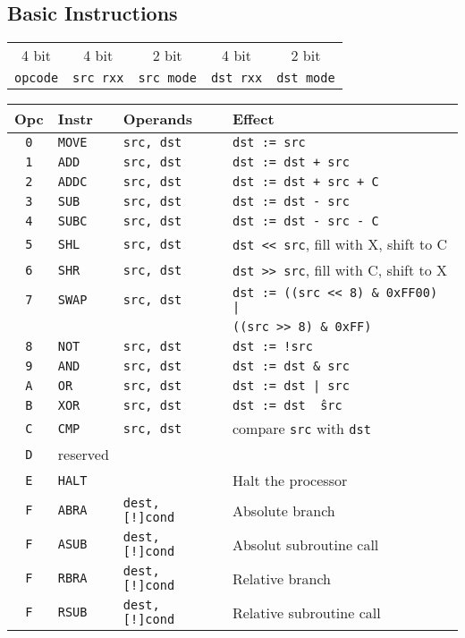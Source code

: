 \documentclass{leaflet}
\begin{document}
  \subsection{Basic Instructions}
   \begin{center}
    \begin{longtable}{|c||c|c||c|c|}
     \hline
     4 bit&4 bit&2 bit&4 bit&2 bit\\
     {\tt opcode}&{\tt src rxx}&{\tt src mode}&
     {\tt dst rxx}&{\tt dst mode}\\
     \hline
    \end{longtable}
   \end{center}
   \vspace*{-17mm}
   {\scriptsize
    \begin{center}
     \begin{longtable}{|c|ll|l|}
      \hline
       Opc&Instr&Operands&Effect\\
      \hline
      \hline
       {\tt 0}&{\tt MOVE}&{\tt src, dst}&{\tt dst := src}\\
       {\tt 1}&{\tt ADD}&{\tt src, dst}&{\tt dst := dst + src}\\
       {\tt 2}&{\tt ADDC}&{\tt src, dst}&{\tt dst := dst + src + C}\\
       {\tt 3}&{\tt SUB}&{\tt src, dst}&{\tt dst := dst - src}\\
       {\tt 4}&{\tt SUBC}&{\tt src, dst}&{\tt dst := dst - src - C}\\
       {\tt 5}&{\tt SHL}&{\tt src, dst}&{\tt dst << src}, fill with X, shift to C\\
       {\tt 6}&{\tt SHR}&{\tt src, dst}&{\tt dst >> src}, fill with C, shift to X\\
       {\tt 7}&{\tt SWAP}&{\tt src, dst}&{\tt dst := ((src << 8) \& 0xFF00) |}\\
              &          &              &{\tt ((src >> 8) \& 0xFF)}\\
       {\tt 8}&{\tt NOT}&{\tt src, dst}&{\tt dst := !src}\\
       {\tt 9}&{\tt AND}&{\tt src, dst}&{\tt dst := dst \& src}\\
       {\tt A}&{\tt OR}&{\tt src, dst}&{\tt dst := dst | src}\\
       {\tt B}&{\tt XOR}&{\tt src, dst}&{\tt dst := dst \^\ src}\\
       {\tt C}&{\tt CMP}&{\tt src, dst}&compare {\tt src} with {\tt dst}\\
       {\tt D}&reserved&&\\
       {\tt E}&{\tt HALT}&&Halt the processor\\
       {\tt F}&{\tt ABRA}&{\tt dest, [!]cond}&Absolute branch\\
       {\tt F}&{\tt ASUB}&{\tt dest, [!]cond}&Absolut subroutine call\\
       {\tt F}&{\tt RBRA}&{\tt dest, [!]cond}&Relative branch\\
       {\tt F}&{\tt RSUB}&{\tt dest, [!]cond}&Relative subroutine call\\
      \hline
     \end{longtable}
    \end{center}
   }
   \vspace*{-14mm}
%
\end{document}
